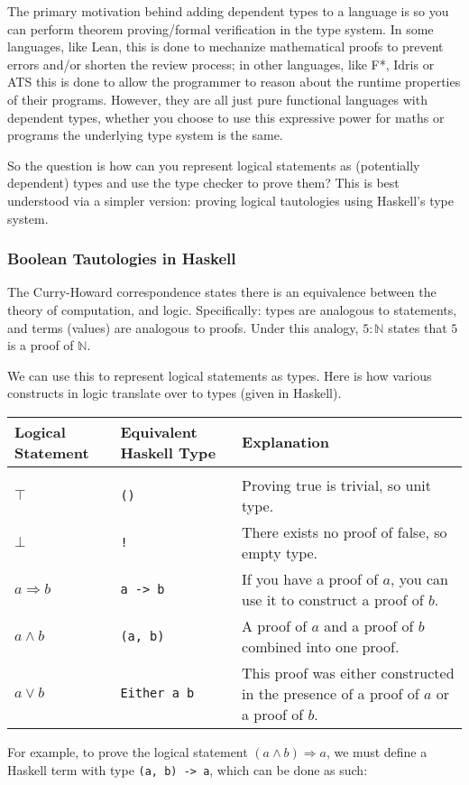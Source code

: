 \documentclass[12pt,twoside]{report}
\begin{document}
The primary motivation behind adding dependent types to a language is so you can perform theorem proving/formal verification in the type system. In some languages, like Lean, this is done to mechanize mathematical proofs to prevent errors and/or shorten the review process; in other languages, like F*, Idris or ATS this is done to allow the programmer to reason about the runtime properties of their programs. However, they are all just pure functional languages with dependent types, whether you choose to use this expressive power for maths or programs the underlying type system is the same.

So the question is how can you represent logical statements as (potentially dependent) types and use the type checker to prove them? This is best understood via a simpler version: proving logical tautologies using Haskell's type system.

\subsubsection{Boolean Tautologies in Haskell}
The Curry-Howard correspondence states there is an equivalence between the theory of computation, and logic. Specifically: types are analogous to statements, and terms (values) are analogous to proofs. Under this analogy, $5 : \mathbb{N}$ states that $5$ is a proof of $\mathbb{N}$.

We can use this to represent logical statements as types. Here is how various constructs in logic translate over to types (given in Haskell).

\begin{tabularx}{\textwidth}{ X|X|X }
  Logical Statement & Equivalent Haskell Type & Explanation \\
  \hline \\
  $\top$ & \verb|()| & Proving true is trivial, so unit type. \\
  $\bot$ & \verb|!| & There exists no proof of false, so empty type. \\
  $a \Rightarrow b$ & \verb|a -> b| & If you have a proof of $a$, you can use it to construct a proof of $b$. \\
  $a \wedge b$ & \verb|(a, b)| & A proof of $a$ and a proof of $b$ combined into one proof. \\
  $a \vee b$ & \verb|Either a b| & This proof was either constructed in the presence of a proof of $a$ or a proof of $b$.
\end{tabularx}

For example, to prove the logical statement $(a \wedge b) \Rightarrow a$, we must define a Haskell term with type \verb|(a, b) -> a|, which can be done as such:
\end{document}
